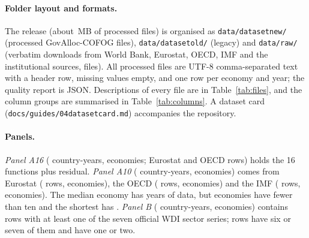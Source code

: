 \documentclass[11pt,a4paper]{article}
\DeclareRobustCommand*{\_}{\textunderscore\hskip0pt\relax}
\begin{document}
\paragraph{Folder layout and formats.} The release (about \DDataTotalMB\,MB of processed files) is organised as \texttt{data/dataset\_new/} (processed GovAlloc-COFOG files), \texttt{data/dataset\_old/} (legacy) and \texttt{data/raw/} (verbatim downloads from World Bank, Eurostat, OECD, IMF and the institutional sources, \DRawFiles{} files). All processed files are UTF-8 comma-separated text with a header row, missing values empty, and one row per economy and year; the quality report is JSON. Descriptions of every file are in Table~\ref{tab:files}, and the column groups are summarised in Table~\ref{tab:columns}. A dataset card (\texttt{docs/guides/04\_dataset\_card.md}) accompanies the repository.



\paragraph{Panels.} \emph{Panel A16} (\DRowsSix{} country-years, \DEconSix{} economies; \DSixRowsEs{} Eurostat and \DSixRowsOecd{} OECD rows) holds the 16 functions plus residual. \emph{Panel A10} (\DRowsTen{} country-years, \DEconTen{} economies) comes from Eurostat (\DTenRowsEs{} rows, \DTenEconEs{} economies), the OECD (\DTenRowsOecd{} rows, \DTenEconOecd{} economies) and the IMF (\DTenRowsImf{} rows, \DTenEconImf{} economies). The median economy has \DTenYrsMedian{} years of data, but \DTenShortN{} economies have fewer than ten and the shortest has \DTenYrsMin. \emph{Panel B} (\DRowsWdi{} country-years, \DEconWdi{} economies) contains rows with at least one of the seven official WDI sector series; \DWdiSixPlus{} rows have six or seven of them and \DWdiOneTwo{} have one or two.
\end{document}
